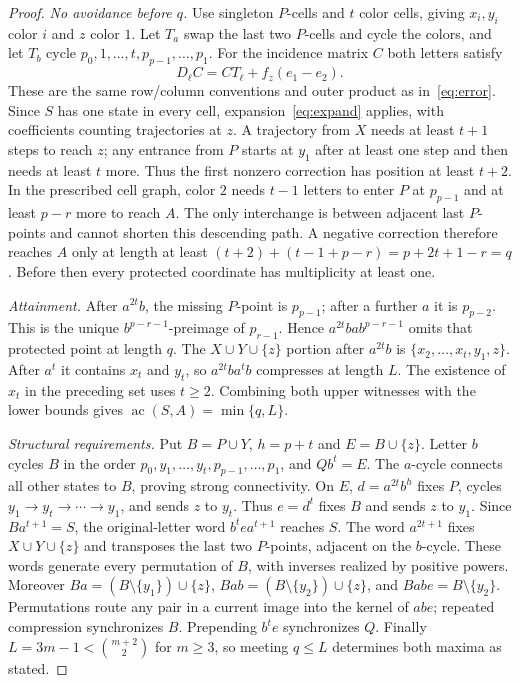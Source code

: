 \documentclass[10pt]{article}
\newcommand{\ac}{\operatorname{ac}}
\begin{document}
\begin{proof}
\emph{No avoidance before $q$.}
Use singleton $P$-cells and $t$ color cells, giving $x_i,y_i$ color $i$
and $z$ color $1$. Let $T_a$ swap the last two $P$-cells and cycle the colors,
and let $T_b$ cycle $p_0,1,\ldots,t,p_{p-1},\ldots,p_1$.
For the incidence matrix $C$ both letters satisfy
\[
 D_\ell C=CT_\ell+f_z(e_1-e_2).
\]
These are the same row/column conventions and outer product as in~\eqref{eq:error}.
Since $S$ has one state in every cell, expansion~\eqref{eq:expand} applies,
with coefficients counting trajectories at $z$.
A trajectory from $X$ needs at least $t+1$ steps to reach $z$;
any entrance from $P$ starts at $y_1$ after at least one step and then needs
at least $t$ more. Thus the first nonzero correction has position at least $t+2$.
In the prescribed cell graph, color $2$ needs $t-1$ letters to enter $P$
at $p_{p-1}$ and at least $p-r$ more to reach $A$.
The only interchange is between adjacent last $P$-points and cannot shorten
this descending path. A negative correction therefore reaches $A$ only at
length at least $(t+2)+(t-1+p-r)=p+2t+1-r=q$.
Before then every protected coordinate has multiplicity at least one.

\emph{Attainment.}
After $a^{2t}b$, the missing $P$-point is $p_{p-1}$; after a further $a$
it is $p_{p-2}$. This is the unique $b^{p-r-1}$-preimage of $p_{r-1}$.
Hence $a^{2t}bab^{p-r-1}$ omits that protected point at length $q$.
The $X\cup Y\cup\{z\}$ portion after $a^{2t}b$ is
$\{x_2,\ldots,x_t,y_1,z\}$. After $a^t$ it contains $x_t$ and $y_t$,
so $a^{2t}ba^tb$ compresses at length $L$.
The existence of $x_t$ in the preceding set uses $t\ge2$.
Combining both upper witnesses with the lower bounds gives $\ac(S,A)=\min\{q,L\}$.

\emph{Structural requirements.}
Put $B=P\cup Y$, $h=p+t$ and $E=B\cup\{z\}$.
Letter $b$ cycles $B$ in the order $p_0,y_1,\ldots,y_t,p_{p-1},\ldots,p_1$,
and $Qb^t=E$. The $a$-cycle connects all other states to $B$, proving
strong connectivity.
On $E$, $d=a^{2t}b^h$ fixes $P$, cycles $y_1\to y_t\to\cdots\to y_1$,
and sends $z$ to $y_t$. Thus $e=d^t$ fixes $B$ and sends $z$ to $y_1$.
Since $Ba^{t+1}=S$, the original-letter word $b^tea^{t+1}$ reaches $S$.
The word $a^{2t+1}$ fixes $X\cup Y\cup\{z\}$ and transposes the last two
$P$-points, adjacent on the $b$-cycle. These words generate every permutation
of $B$, with inverses realized by positive powers.
Moreover $Ba=(B\setminus\{y_1\})\cup\{z\}$,
$Bab=(B\setminus\{y_2\})\cup\{z\}$, and $Babe=B\setminus\{y_2\}$.
Permutations route any pair in a current image into the kernel of $abe$;
repeated compression synchronizes $B$. Prepending $b^te$ synchronizes $Q$.
Finally $L=3m-1<\binom{m+2}{2}$ for $m\ge3$, so meeting $q\le L$
determines both maxima as stated.
\end{proof}
\end{document}
